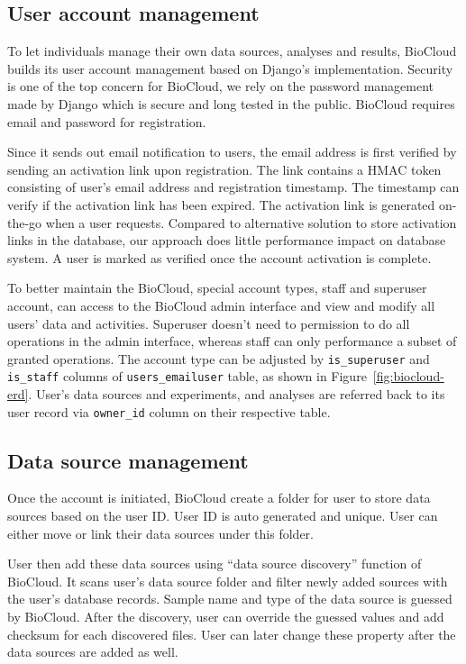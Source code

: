 \subsection{User account management}

To let individuals manage their own data sources, analyses and results,
BioCloud builds its user account management based on Django's implementation.
Security is one of the top concern for BioCloud, we rely on the password
management made by Django which is secure and long tested in the public.
BioCloud requires email and password for registration.

Since it sends out email notification to users, the email address is first
verified by sending an activation link upon registration. The link contains a
HMAC token consisting of user's email address and registration timestamp. The
timestamp can verify if the activation link has been expired. The activation
link is generated on-the-go when a user requests. Compared to alternative
solution to store activation links in the database, our approach does little
performance impact on database system. A user is marked as verified once the
account activation is complete.

To better maintain the BioCloud, special account types, staff and superuser
account, can access to the BioCloud admin interface and view and modify all
users' data and activities. Superuser doesn't need to permission to do all
operations in the admin interface, whereas staff can only performance a subset
of granted operations. The account type can be adjusted by
\texttt{is\_superuser} and \texttt{is\_staff} columns of
\texttt{users\_emailuser} table, as shown in Figure~\ref{fig:biocloud-erd}.
User's data sources and experiments, and analyses are referred back to its user
record via \texttt{owner\_id} column on their respective table.


\subsection{Data source management}

Once the account is initiated, BioCloud create a folder for user to store
data sources based on the user ID. User ID is auto generated and unique. User
can either move or link their data sources under this folder.

User then add these data sources using ``data source discovery'' function of
BioCloud. It scans user's data source folder and filter newly added sources
with the user's database records. Sample name and type of the data source is
guessed by BioCloud. After the discovery, user can override the guessed values
and add checksum for each discovered files. User can later change these
property after the data sources are added as well.

